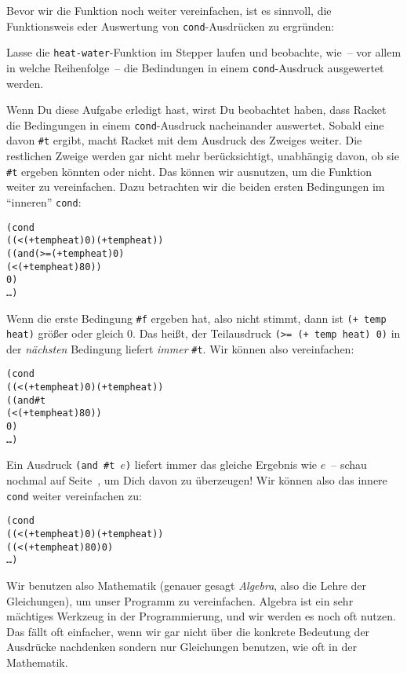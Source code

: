 Bevor wir die Funktion noch weiter vereinfachen, ist es sinnvoll, die
Funktionsweis eder Auswertung von \texttt{cond}-Ausdrücken zu ergründen:
%
\begin{aufgabe}
  Lasse die \texttt{heat-water}-Funktion im Stepper laufen und
  beobachte, wie~-- vor allem in welche Reihenfolge~-- die Bedindungen
  in einem \texttt{cond}-Ausdruck ausgewertet werden.
\end{aufgabe}
%
Wenn Du diese Aufgabe erledigt hast, wirst Du beobachtet haben, dass Racket
die Bedingungen in einem \texttt{cond}-Ausdruck nacheinander
auswertet.  Sobald eine davon \verb|#t| ergibt, macht Racket mit dem
Ausdruck des Zweiges weiter.  Die restlichen Zweige werden gar nicht
mehr berücksichtigt, unabhängig davon, ob sie \verb|#t| ergeben
könnten oder nicht.
Das können wir ausnutzen, um die Funktion weiter zu vereinfachen.
Dazu betrachten wir die beiden ersten Bedingungen im "`inneren"'
\texttt{cond}:
%
\begin{alltt}
       (cond
         ((< (+ temp heat) 0) (+ temp heat))
         ((and (>= (+ temp heat) 0)
               (< (+ temp heat) 80))
          0)
         \ldots)
\end{alltt}
%
Wenn die erste Bedingung \verb|#f| ergeben hat, also nicht stimmt,
dann ist \texttt{(+ temp heat)} größer oder gleich 0.  Das heißt, der
Teilausdruck \texttt{(>= (+ temp heat) 0)} in der \emph{nächsten}
Bedingung liefert \emph{immer} \verb|#t|.  Wir können also
vereinfachen:
%
\begin{alltt}
       (cond
         ((< (+ temp heat) 0) (+ temp heat))
         ((and #t
               (< (+ temp heat) 80))
          0)
         \ldots)
\end{alltt}
%
Ein Ausdruck \texttt{(and \#t \(e\))} liefert immer das gleiche Ergebnis
wie \(e\)~-- schau nochmal auf Seite~\pageref{page:and}, um Dich davon
zu überzeugen!  Wir können also das innere \texttt{cond} weiter
vereinfachen zu:
%
\begin{alltt}
       (cond
         ((< (+ temp heat) 0) (+ temp heat))
         ((< (+ temp heat) 80) 0)
         \ldots)
\end{alltt}
%
Wir benutzen also Mathematik (genauer gesagt
\textit{Algebra}, also die Lehre der Gleichungen), um
unser Programm zu vereinfachen.  Algebra ist ein sehr mächtiges
Werkzeug in der Programmierung, und wir werden es noch oft nutzen.
Das fällt oft einfacher, wenn wir gar nicht über die konkrete
Bedeutung der Ausdrücke nachdenken sondern nur Gleichungen benutzen,
wie oft in der Mathematik.

